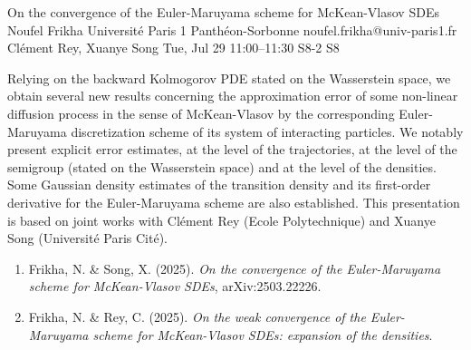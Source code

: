 \documentclass[12pt,lettersize,oneside]{book} %
\begin{document}
\begin{talk}
  {On the convergence of the Euler-Maruyama scheme for McKean-Vlasov SDEs}%
  {Noufel Frikha}%
  {Universit\'e Paris 1 Panth\'eon-Sorbonne}%
  {noufel.frikha@univ-paris1.fr}%
  {Cl\'ement Rey, Xuanye Song}%
  {}%
  {Tue, Jul 29 11:00--11:30}%
  {S8-2}%
  {S8}%
  
    
   
Relying on the backward Kolmogorov PDE stated on the Wasserstein space, we obtain several new results concerning the approximation error of some non-linear diffusion process in the sense of McKean-Vlasov by the corresponding Euler-Maruyama discretization scheme of its system of interacting particles. We notably present explicit error estimates, at the level of the trajectories, at the level of the semigroup (stated on the Wasserstein space) and at the level of the densities. Some Gaussian density estimates of the transition density and its first-order derivative for the Euler-Maruyama scheme are also established. This presentation is based on joint works with Cl\'ement Rey (Ecole Polytechnique) and Xuanye Song (Universit\'e Paris Cit\'e).

\medskip


\begin{enumerate}
 \item[{[1]}] Frikha, N.  \& Song, X. (2025). {\it On the convergence of the Euler-Maruyama scheme for McKean-Vlasov SDEs}, arXiv:2503.22226.
 \item[{[2]}] Frikha, N. \& Rey, C. (2025).  {\it On the weak convergence of the Euler-Maruyama scheme for McKean-Vlasov SDEs: expansion of the densities}.
\end{enumerate}


\end{talk}
\end{document}
